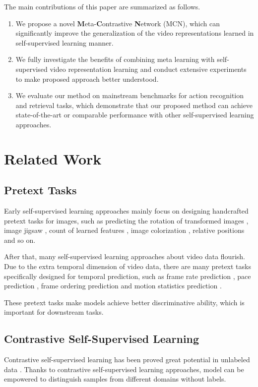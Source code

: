 \documentclass[10pt,twocolumn,letterpaper]{article}
\begin{document}
The main contributions of this paper are summarized as follows.
\begin{enumerate}[label=\arabic*)]
\item We propose a novel \textbf{M}eta-\textbf{C}ontrastive \textbf{N}etwork (MCN), which can significantly improve the generalization of the video representations learned in self-supervised learning manner.

\item We fully investigate the benefits of combining meta learning with self-supervised video representation learning and conduct extensive experiments to make proposed approach better understood.

\item We evaluate our method on mainstream benchmarks for action recognition and retrieval tasks, which demonstrate that our proposed method can achieve state-of-the-art or comparable performance with other self-supervised learning approaches.
\end{enumerate}

\section{Related Work}
\subsection{Pretext Tasks} 

Early self-supervised learning approaches mainly focus on designing handcrafted pretext tasks for images, such as predicting the rotation of transformed images \cite{gidaris2018unsupervised}, image jigsaw \cite{doersch2015unsupervised}, count of learned features \cite{noroozi2017representation}, image colorization \cite{zhang2016colorful}, relative positions \cite{doersch2015unsupervised} and so on. 

After that, many self-supervised learning approaches about video data flourish. Due to the extra temporal dimension of video data, there are many pretext tasks specifically designed for temporal prediction, such as frame rate prediction \cite{wang2020self},  pace prediction \cite{benaim2020speednet},  frame ordering prediction \cite{xu2019self, lee2017unsupervised, fernando2017self} and motion statistics prediction \cite{wang2019self}. 

These pretext tasks make models achieve better discriminative ability, which is important for downstream tasks.

\subsection{Contrastive Self-Supervised Learning}
Contrastive self-supervised learning has been proved great potential in unlabeled data \cite{he2020momentum, tian2019contrastive, henaff2020data, chen2020simple, misra2020self, han2019video}. Thanks to contrastive self-supervised learning approaches, model can be empowered to distinguish samples from different domains without labels.
\end{document}
